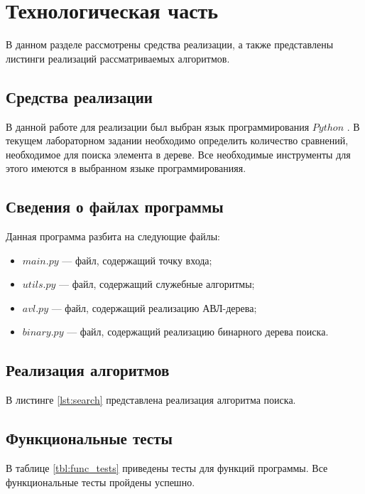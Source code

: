 \chapter{Технологическая часть}

В данном разделе рассмотрены средства реализации, а также представлены листинги реализаций рассматриваемых алгоритмов.

\section{Средства реализации}

В данной работе для реализации был выбран язык программирования $Python$ \cite{python-lang}.
В текущем лабораторном задании необходимо определить количество сравнений, необходимое для поиска элемента в дереве. 
Все необходимые инструменты для этого имеются в выбранном языке программированияя.

\section{Сведения о файлах программы}

Данная программа разбита на следующие файлы:
\begin{itemize}
	\item $main.py$ --- файл, содержащий точку входа;
	\item $utils.py$ --- файл, содержащий служебные алгоритмы;
	\item $avl.py$ --- файл, содержащий реализацию АВЛ-дерева;
	\item $binary.py$ --- файл, содержащий реализацию бинарного дерева поиска.
\end{itemize}

\section{Реализация алгоритмов}

В листинге \ref{lst:search} представлена реализация алгоритма поиска.



\section{Функциональные тесты}

В таблице \ref{tbl:func_tests} приведены тесты для функций программы. Все функциональные тесты пройдены успешно.

